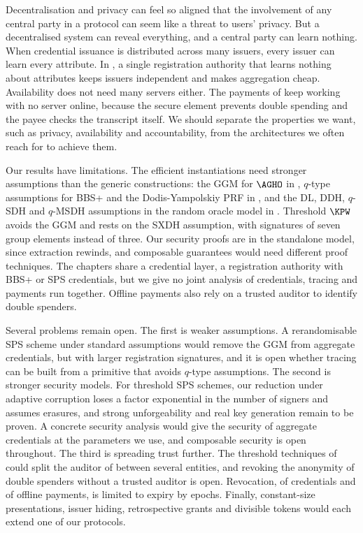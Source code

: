 Decentralisation and privacy can feel so aligned that the involvement of any
central party in a protocol can seem like a threat to users' privacy. But a
decentralised system can reveal everything, and a central party can learn
nothing. When credential issuance is distributed across many issuers, every
issuer can learn every attribute. In , a single
registration authority that learns nothing about attributes keeps issuers
independent and makes aggregation cheap. Availability does not need many
servers either. The payments of  keep working with
no server online, because the secure element prevents double spending and the
payee checks the transcript itself. We should separate the properties we want,
such as privacy, availability and accountability, from the architectures we
often reach for to achieve them.

Our results have limitations. The efficient instantiations need stronger
assumptions than the generic constructions: the GGM for $\AGHO$ in
, $q$-type assumptions for BBS+ and the
Dodis-Yampolskiy PRF in , and the DL, DDH, $q$-SDH and $q$-MSDH
assumptions in the random oracle model in .
Threshold $\KPW$ avoids the GGM and rests on the SXDH assumption, with
signatures of seven group elements instead of three. Our security proofs are in
the standalone model, since extraction rewinds, and composable guarantees would
need different proof techniques. The chapters share a credential layer, a
registration authority with BBS+ or SPS credentials, but we give no joint
analysis of credentials, tracing and payments run together. Offline payments
also rely on a trusted auditor to identify double spenders.

Several problems remain open. The first is weaker assumptions. A rerandomisable
SPS scheme under standard assumptions would remove the GGM from aggregate
credentials, but with larger registration signatures, and it is open whether
tracing can be built from a primitive that avoids $q$-type assumptions.  The
second is stronger security models. For threshold SPS schemes, our reduction
under adaptive corruption loses a factor exponential in the number of signers
and assumes erasures, and strong unforgeability and real key generation remain
to be proven. A concrete security analysis would give the security of aggregate
credentials at the parameters we use, and composable security is open
throughout. The third is spreading trust further. The threshold techniques of
 could split the auditor of  between several
entities, and revoking the anonymity of double spenders without a trusted
auditor is open. Revocation, of credentials and of offline payments, is limited
to expiry by epochs. Finally, constant-size presentations, issuer hiding,
retrospective grants and divisible tokens would each extend one of our
protocols.

